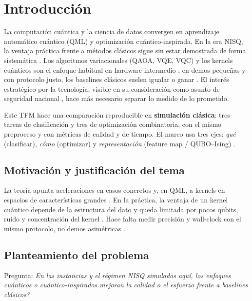 \chapter{Introducción}\label{cap:introduccion}

La computación cuántica y la ciencia de datos convergen en aprendizaje automático cuántico (QML) y optimización cuántico-inspirada. En la era NISQ, la ventaja práctica frente a métodos clásicos sigue sin estar demostrada de forma sistemática \citep{preskill2018, biamonte2017}. Los algoritmos variacionales (QAOA, VQE, VQC) y los kernels cuánticos son el enfoque habitual en hardware intermedio \citep{farhi2014, cerezo2021, havlicek2019}; en demos pequeñas y con protocolo justo, los baselines clásicos suelen igualar o ganar \citep{bowles2024, yu2026, githubZ537Qml}. El interés estratégico por la tecnología, visible en su consideración como asunto de seguridad nacional \citep{qzFbi}, hace más necesario separar lo medido de lo prometido.

Este TFM hace una comparación reproducible en \textbf{simulación clásica}: tres tareas de clasificación y tres de optimización combinatoria, con el mismo preproceso y con métricas de calidad y de tiempo. El marco usa tres ejes: \emph{qué} (clasificar), \emph{cómo} (optimizar) y \emph{representación} (feature map / QUBO--Ising) \citep{lloyd2020, pennylaneEmbedBlog, parzygnat2025}.

\section{Motivación y justificación del tema}

La teoría apunta aceleraciones en casos concretos \citep{grover1996, shor1994} y, en QML, a kernels en espacios de características grandes \citep{havlicek2019, schuld2021}. En la práctica, la ventaja de un kernel cuántico depende de la estructura del dato \citep{huang2021} y queda limitada por pocos qubits, ruido y concentración del kernel \citep{preskill2018, thanasilp2022, mcclean2018}. Hace falta medir precisión y wall-clock con el mismo protocolo, no demos asimétricas \citep{bowles2024}.

\section{Planteamiento del problema}

Pregunta: \textit{\textquestiondown{}En las instancias y el régimen NISQ simulados aquí, los enfoques cuánticos o cuántico-inspirados mejoran la calidad o el esfuerzo frente a baselines clásicos?}


